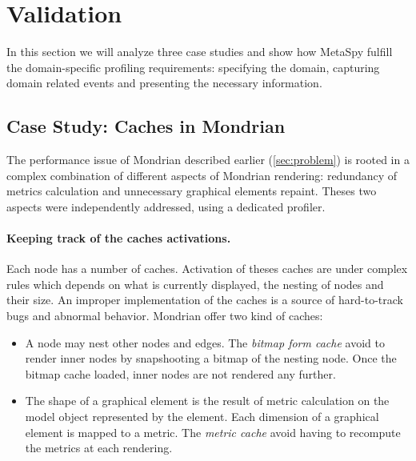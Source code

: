 \documentclass[runningheads]{llncs}
\newcommand{\project}{{\sc MetaSpy}\xspace}
\newcommand{\ab}[1]{\nb{Alexandre}{blue}{#1}}
\newcommand{\jr}[1]{\nb{Jorge}{cyan}{#1}}
\newcommand{\seclabel}[1]{\label{sec:#1}}
\begin{document}
\section{Validation}\seclabel{validation}

In this section we will analyze three case studies and show how \project fulfill the domain-specific profiling requirements: specifying the domain, capturing domain related events and presenting the necessary information.

\subsection{Case Study: Caches in Mondrian}


The performance issue of Mondrian described earlier (\autoref{sec:problem}) is rooted in a complex combination of different aspects of Mondrian rendering: redundancy of metrics calculation and unnecessary graphical elements repaint. Theses two aspects were independently addressed, using a dedicated profiler.

\paragraph{Keeping track of the caches activations.}
Each node has a number of caches. Activation of theses caches are under complex rules which depends on what is currently displayed, the nesting of nodes and their size. An improper implementation of the caches is a source of hard-to-track bugs and abnormal behavior. Mondrian offer two kind of caches:
\begin{itemize}
\item A node may nest other nodes and edges. The \emph{bitmap form cache} avoid to render inner nodes by snapshooting a bitmap of the nesting node. Once the bitmap cache loaded, inner nodes are not rendered any further.
\item The shape of a graphical element is the result of metric calculation on the model object represented by the element. Each dimension of a graphical element is mapped to a metric. The \emph{metric cache} avoid having to recompute the metrics at each rendering.
\end{itemize}
\end{document}
